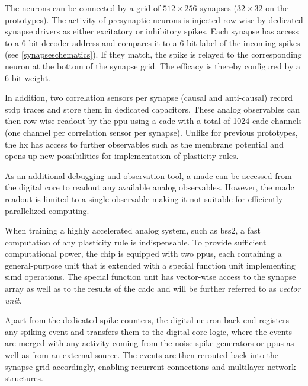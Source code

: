 The neurons can be connected by a grid of $512 \times 256$ synapses ($32 \times 32$ on the prototypes). The activity of presynaptic neurons is injected row-wise by dedicated synapse drivers as either excitatory or inhibitory spikes. Each synapse has access to a 6-bit decoder address and compares it to a 6-bit label of the incoming spikes (see \cref{synapseschematics}). If they match, the spike is relayed to the corresponding neuron at the bottom of the synapse grid. The efficacy is thereby configured by a 6-bit weight.


In addition, two correlation sensors per synapse (causal and anti-causal) record \gls{stdp} traces and store them in dedicated capacitors. These analog observables can then row-wise readout by the \gls{ppu} using a \gls{cadc} with a total of 1024 \gls{cadc} channels (one channel per correlation sensor per synapse). Unlike for previous prototypes, the \gls{hx} has access to further observables such as the membrane potential and opens up new possibilities for implementation of plasticity rules. 

As an additional debugging and observation tool, a \gls{madc} can be accessed from the digital core to readout any available analog observables. However, the \gls{madc} readout is limited to a single observable making it not suitable for efficiently parallelized computing.

When training a highly accelerated analog system, such as \gls{bss2}, a fast computation of any plasticity rule is indispensable. To provide sufficient computational power, the chip is equipped with two \glspl{ppu}, each containing a general-purpose unit that is extended with a special function unit implementing \gls{simd} operations. The special function unit has vector-wise access to the synapse array as well as to the results of the \gls{cadc} and will be further referred to as \emph{vector unit}.

Apart from the dedicated spike counters, the digital neuron back end registers any spiking event and transfers them to the digital core logic, where the events are merged with any activity coming from the noise spike generators or \glspl{ppu} as well as from an external source. The events are then rerouted back into the synapse grid accordingly, enabling recurrent connections and multilayer network structures.

